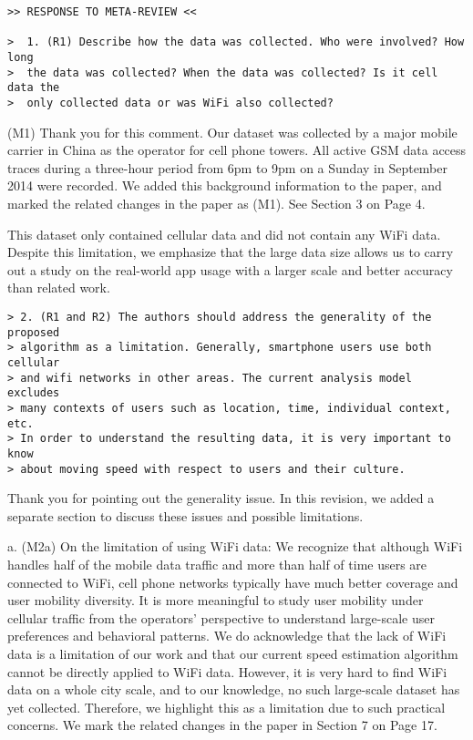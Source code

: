 \newpage
\begin{verbatim}
>> RESPONSE TO META-REVIEW <<

>  1. (R1) Describe how the data was collected. Who were involved? How long
>  the data was collected? When the data was collected? Is it cell data the
>  only collected data or was WiFi also collected?
\end{verbatim}

(M1) Thank you for this comment. Our dataset was collected by a major mobile carrier in China as the operator for cell phone towers. All active GSM data access traces during a three-hour period from 6pm to 9pm on a Sunday in September 2014 were recorded. We added this background information to the paper, and marked the related changes in the paper as (M1). See Section 3 on Page 4.

This dataset only contained cellular data and did not contain any WiFi data. Despite this limitation, we emphasize that the large data size allows us to carry out a study on the real-world app usage with a larger scale and better accuracy than related work. 

\begin{verbatim}
> 2. (R1 and R2) The authors should address the generality of the proposed
> algorithm as a limitation. Generally, smartphone users use both cellular
> and wifi networks in other areas. The current analysis model excludes
> many contexts of users such as location, time, individual context, etc.
> In order to understand the resulting data, it is very important to know
> about moving speed with respect to users and their culture.
\end{verbatim}

Thank you for pointing out the generality issue. In this revision, we added a separate section to discuss these issues and possible limitations. 

a. (M2a) On the limitation of using WiFi data:
We recognize that although WiFi handles half of the mobile data traffic and more than half of time users are connected to WiFi, cell phone networks typically have much better coverage and user mobility diversity. It is more meaningful to study user mobility under cellular traffic from the operators' perspective to understand large-scale user preferences and behavioral patterns. We do acknowledge that the lack of WiFi data is a limitation of our work and that our current speed estimation algorithm cannot be directly applied to WiFi data. However, it is very hard to find WiFi data on a whole city scale, and to our knowledge, no such large-scale dataset has yet collected. Therefore, we highlight this as a limitation due to such practical concerns. 
We mark the related changes in the paper in Section 7 on Page 17.


